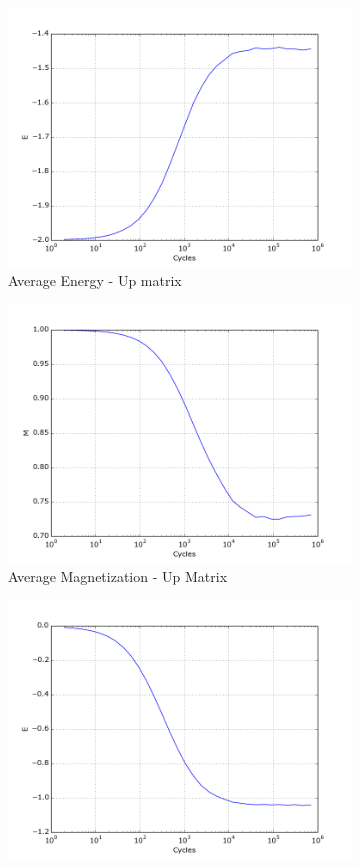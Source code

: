\documentclass[10pt,a4paper,titlepage]{article}
\begin{document}
\begin{figure}[H]
  \centering
\begin{subfigure}{.42\textwidth}
  \centering
  \includegraphics[width=.8\linewidth]{ENERGY_T24_UP_10000MEAN}
  \caption{{\footnotesize Average Energy - Up matrix}}
  \label{fig:sfig1}
\end{subfigure}%
\begin{subfigure}{.42\textwidth}
  \centering
  \includegraphics[width=.8\linewidth]{MAGNETIZATION_T24_UP_10000MEAN}
  \caption{{\footnotesize Average Magnetization - Up Matrix}}
  \label{fig:sfig2}
\end{subfigure}
\begin{subfigure}{.42\textwidth}
  \centering
  \includegraphics[width=.8\linewidth]{ENERGY_T24_RAND_10000MEAN}

\end{subfigure}
\end{figure}
\end{document}
